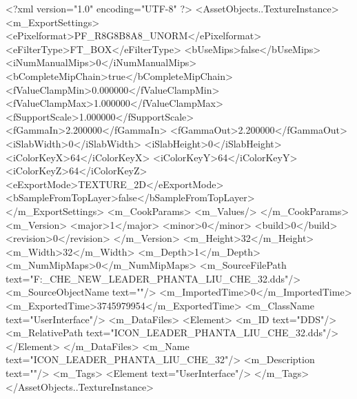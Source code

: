 <?xml version="1.0" encoding="UTF-8" ?>
<AssetObjects..TextureInstance>
	<m_ExportSettings>
		<ePixelformat>PF_R8G8B8A8_UNORM</ePixelformat>
		<eFilterType>FT_BOX</eFilterType>
		<bUseMips>false</bUseMips>
		<iNumManualMips>0</iNumManualMips>
		<bCompleteMipChain>true</bCompleteMipChain>
		<fValueClampMin>0.000000</fValueClampMin>
		<fValueClampMax>1.000000</fValueClampMax>
		<fSupportScale>1.000000</fSupportScale>
		<fGammaIn>2.200000</fGammaIn>
		<fGammaOut>2.200000</fGammaOut>
		<iSlabWidth>0</iSlabWidth>
		<iSlabHeight>0</iSlabHeight>
		<iColorKeyX>64</iColorKeyX>
		<iColorKeyY>64</iColorKeyY>
		<iColorKeyZ>64</iColorKeyZ>
		<eExportMode>TEXTURE_2D</eExportMode>
		<bSampleFromTopLayer>false</bSampleFromTopLayer>
	</m_ExportSettings>
	<m_CookParams>
		<m_Values/>
	</m_CookParams>
	<m_Version>
		<major>1</major>
		<minor>0</minor>
		<build>0</build>
		<revision>0</revision>
	</m_Version>
	<m_Height>32</m_Height>
	<m_Width>32</m_Width>
	<m_Depth>1</m_Depth>
	<m_NumMipMaps>0</m_NumMipMaps>
	<m_SourceFilePath text="F:\MOD\TEMPLATE\LIU_CHE_NEW\ICON_LEADER_PHANTA_LIU_CHE_32.dds"/>
	<m_SourceObjectName text=""/>
	<m_ImportedTime>0</m_ImportedTime>
	<m_ExportedTime>3745979954</m_ExportedTime>
	<m_ClassName text="UserInterface"/>
	<m_DataFiles>
		<Element>
			<m_ID text="DDS"/>
			<m_RelativePath text="ICON_LEADER_PHANTA_LIU_CHE_32.dds"/>
		</Element>
	</m_DataFiles>
	<m_Name text="ICON_LEADER_PHANTA_LIU_CHE_32"/>
	<m_Description text=""/>
	<m_Tags>
		<Element text="UserInterface"/>
	</m_Tags>
</AssetObjects..TextureInstance>

